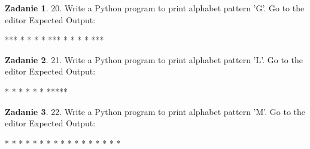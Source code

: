 \documentclass[11pt]{article}
\theoremstyle{definition}
\newtheorem{zadanie}{Zadanie}
\begin{document}
\begin{zadanie}


20. Write a Python program to print alphabet pattern 'G'. Go to the editor
Expected Output:

  ***                                                                   
 *   *                                                                  
 *                                                                      
 * ***                                                                  
 *   *                                                                  
 *   *                                                                  
  *** 



\end{zadanie}

\begin{zadanie}


21. Write a Python program to print alphabet pattern 'L'. Go to the editor
Expected Output:

 *                                                                      
 *                                                                      
 *                                                                      
 *                                                                      
 *                                                                      
 *                                                                      
 *****



\end{zadanie}

\begin{zadanie}


22. Write a Python program to print alphabet pattern 'M'. Go to the editor
Expected Output:

  *       *                                                             
  *       *                                                             
  * *   * *                                                             
  *   *   *                                                             
  *       *                                                             
  *       *                                                             
  *       *



\end{zadanie}
\end{document}

